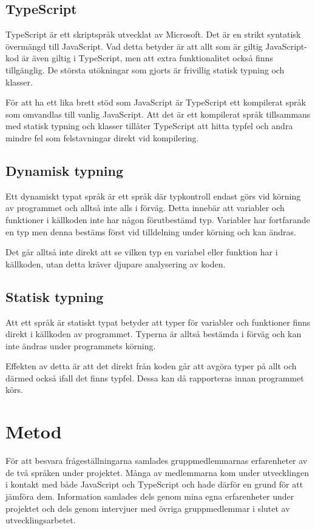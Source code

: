 \subsection{TypeScript}
TypeScript är ett skriptspråk utvecklat av Microsoft. Det är en strikt syntatisk övermängd till JavaScript. \cite{henrik_ts1} Vad detta betyder är att allt som är giltig JavaScript-kod är även giltig i TypeScript, men att extra funktionalitet också finns tillgänglig. De största utökningar som gjorts är frivillig statisk typning och klasser.

För att ha ett lika brett stöd som JavaScript är TypeScript ett kompilerat språk som omvandlas till vanlig JavaScript. Att det är ett kompilerat språk tillsammans med statisk typning och klasser tillåter TypeScript att hitta typfel och andra mindre fel som felstavningar direkt vid kompilering.
\subsection{Dynamisk typning}
Ett dynamiskt typat språk är ett språk där typkontroll endast görs vid körning av programmet och alltså inte alls i förväg. Detta innebär att variabler och funktioner i källkoden inte har någon förutbestämd typ. Variabler har fortfarande en typ men denna bestäms först vid tilldelning under körning och kan ändras.

Det går alltså inte direkt att se vilken typ en variabel eller funktion har i källkoden, utan detta kräver djupare analysering av koden.
\subsection{Statisk typning}
Att ett språk är statiskt typat betyder att typer för variabler och funktioner finns direkt i källkoden av programmet. Typerna är alltså bestämda i förväg och kan inte ändras under programmets körning.

Effekten av detta är att det direkt från koden går att avgöra typer på allt och därmed också ifall det finns typfel. Dessa kan då rapporteras innan programmet körs.
\section{Metod}
För att besvara frågeställningarna samlades gruppmedlemmarnas erfarenheter av de två språken under projektet. Många av medlemmarna kom under utvecklingen i kontakt med både JavaScript och TypeScript och hade därför en grund för att jämföra dem. Information samlades dels genom mina egna erfarenheter under projektet och dels genom intervjuer med övriga gruppmedlemmar i slutet av utvecklingsarbetet.

